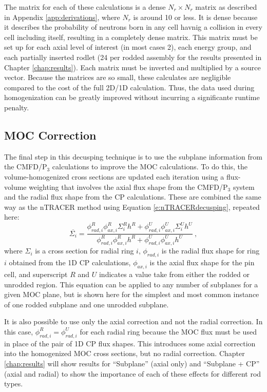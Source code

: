 The matrix for each of these calculations is a dense $N_r \times N_r$ matrix as described in Appendix \ref{app:derivations}, where $N_r$ is around 10 or less.  It is dense because it describes the probability of neutrons born in any cell havnig a collision in every cell including itself, resulting in a completely dense matrix.  This matrix must be set up for each axial level of interest (in most cases 2), each energy group, and each partially inserted rodlet (24 per rodded assembly for the results presented in Chapter \ref{chap:results}).  Each matrix must be inverted and multiplied by a source vector.  Because the matrices are so small, these calculates are negligible compared to the cost of the full 2D/1D calculation.  Thus, the data used during homogenization can be greatly improved without incurring a significante runtime penalty.

\subsection{MOC Correction}

The final step in this decusping technique is to use the subplane information from the CMFD/P$_3$ calculations to improve the MOC calculations.  To do this, the volume-homogenized cross sections are updated each iteration using a flux-volume weighting that involves the axial flux shape from the CMFD/P$_3$ system and the radial flux shape from the CP calculations.  These are combined the same way as the nTRACER method using Equation \ref{e:nTRACERdecusping}, repeated here:
\begin{equation}
\overline{\Sigma_i} = \frac{\phi_{rad,i}^R \phi_{ax,i}^R \Sigma_i^R h^R + \phi_{rad,i}^U \phi_{ax,i}^U \Sigma_i^U h^U}{\phi_{rad,i}^R \phi_{ax,i}^R h^R + \phi_{rad,i}^U \phi_{ax,i}^U h^U}\ , \nonumber
\end{equation}
where $\Sigma_i$ is a cross section for radial ring $i$, $\phi_{rad,i}$ is the radial flux shape for ring $i$ obtained from the 1D CP calculations, $\phi_{ax,i}$ is the axial flux shape for the pin cell, and superscript $R$ and $U$ indicates a value take from either the rodded or unrodded region.  This equation can be applied to any number of subplanes for a given MOC plane, but is shown here for the simplest and most common instance of one rodded subplane and one unrodded subplane.

It is also possible to use only the axial correction and not the radial correction.  In this case, $\phi_{rad,i}^R = \phi_{rad,i}^U$ for each radial ring because the MOC flux must be used in place of the pair of 1D CP flux shapes.  This introduces some axial correction into the homogenized MOC cross sections, but no radial correction.  Chapter \ref{chap:results} will show results for ``Subplane'' (axial only) and ``Subplane + CP'' (axial and radial) to show the importance of each of these effects for different rod types.

